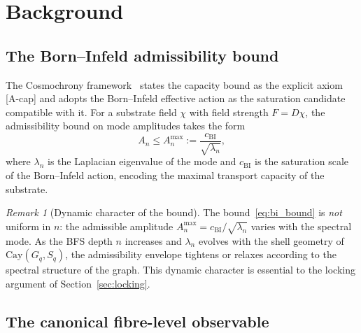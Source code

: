 \documentclass[12pt,a4paper]{article}
\theoremstyle{remark}
\newtheorem{remark}[theorem]{Remark}
\newcommand{\cchi}{c_{\mathrm{BI}}}
\newcommand{\Amax}{A_n^{\max}}
\newcommand{\Cay}{\mathrm{Cay}(G_q, S_q)}
\begin{document}
  \section{Background}
  \label{sec:background}

  \subsection{The Born--Infeld admissibility bound}
    \label{subsec:bi_bound}

    The Cosmochrony framework~\cite{Cosmochrony,Beau2026c} states the capacity bound as the
    explicit axiom [A-cap] and adopts the Born--Infeld effective action as the saturation
    candidate compatible with it.
    For a substrate field $\chi$ with field strength $F = D\chi$, the admissibility bound on mode
    amplitudes takes the form~\cite{Beau2026a1}
    \begin{equation}
      \label{eq:bi_bound}
      A_n \leq \Amax := \frac{\cchi}{\sqrt{\lambda_n}},
    \end{equation}
    where $\lambda_n$ is the Laplacian eigenvalue of the mode and $\cchi$ is the saturation scale
    of the Born--Infeld action, encoding the maximal transport capacity of the substrate.

    \begin{remark}[Dynamic character of the bound]
      \label{rem:dynamic_bound}
      The bound~\eqref{eq:bi_bound} is \emph{not} uniform in $n$: the admissible amplitude
      $\Amax = \cchi/\sqrt{\lambda_n}$ varies with the spectral mode.
      As the BFS depth $n$ increases and $\lambda_n$ evolves with the shell geometry of~$\Cay$,
      the admissibility envelope tightens or relaxes according to the spectral structure of the graph.
      This dynamic character is essential to the locking argument of Section~\ref{sec:locking}.
    \end{remark}

  \subsection{The canonical fibre-level observable}
    \label{subsec:canonical_observable}
\end{document}
